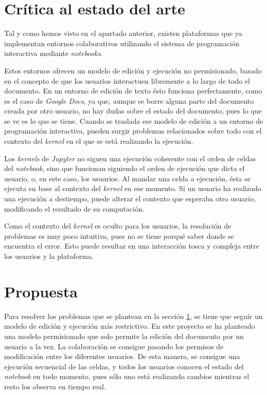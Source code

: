 \documentclass[11pt,spanish,listoffigures]{tfgetsinf}
\begin{document}

\section{Crítica al estado del arte}
\label{sec:critica-estado}

Tal y como hemos visto en el apartado anterior, existen plataformas que ya implementan entornos colaborativos utilizando el sistema de programación interactiva mediante \textit{notebooks}. 

Estos entornos ofrecen un modelo de edición y ejecución no permisionado, basado en el concepto de que los usuarios interactuen libremente a lo largo de todo el documento. En un entorno de edición de texto ésto funciona perfectamente, como es el caso de \textit{Google Docs}, ya que, aunque se borre alguna parte del documento creada por otro usuario, no hay dudas sobre el estado del documento, pues lo que se ve es lo que se tiene. Cuando se traslada ese modelo de edición a un entorno de programación interactiva, pueden surgir problemas relacionados sobre todo con el contexto del \textit{kernel} en el que se está realizando la ejecución.

Los \textit{kernels} de \textit{Jupyter} no siguen una ejecución coherente con el orden de celdas del \textit{notebook}, sino que funcionan siguiendo el orden de ejecución que dicta el usuario, o, en este caso, los usuarios. Al mandar una celda a ejecución, ésta se ejecuta en base al contexto del \textit{kernel} en ese momento. Si un usuario ha realizado una ejecución a destiempo, puede alterar el contexto que esperaba otro usuario, modificando el resultado de su computación. 

Como el contexto del \textit{kernel} es oculto para los usuarios, la resolución de problemas es muy poco intuitiva, pues no se tiene porqué saber donde se encuentra el error. Esto puede resultar en una interacción tosca y compleja entre los usuarios y la plataforma.



\section{Propuesta}
\label{sec:propuesta}

Para resolver los problemas que se plantean en la sección \ref{sec:critica-estado}, se tiene que seguir un modelo de edición y ejecución más restrictivo. En este proyecto se ha planteado una modelo permisionado que solo permite la edición del documento por un usuario a la vez. La colaboración se consigue pasando los permisos de modificación entre los diferentes usuarios. De esta manera, se consigue una ejecución secuencial de las celdas, y todos los usuarios conocen el estado del \textit{notebook} en todo momento, pues sólo uno está realizando cambios mientras el resto los observa en tiempo real.
\end{document}
